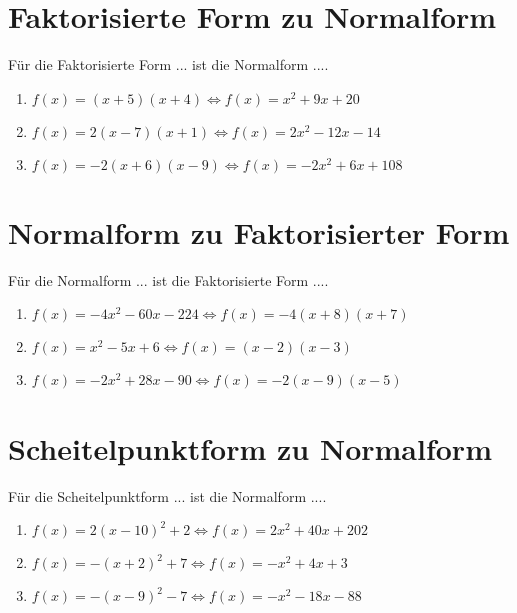 \documentclass{article}%
\begin{document}
\section{Faktorisierte Form zu Normalform}%
\label{sec:FaktorisierteFormzuNormalform}%
Für die Faktorisierte Form ... ist die Normalform ....%
\begin{enumerate}[label=\alph*)]%
\item%
\newline\vspace{0.5cm}$f(x)=(x+5)(x+4)\Leftrightarrow f(x)=x^2 + 9x + 20$%
\item%
\newline\vspace{0.5cm}$f(x)=2(x-7)(x+1)\Leftrightarrow f(x)=2x^2 - 12x - 14$%
\item%
\newline\vspace{0.5cm}$f(x)=-2(x+6)(x-9)\Leftrightarrow f(x)=-2x^2 + 6x + 108$%
\end{enumerate}

%
\section{Normalform zu Faktorisierter Form}%
\label{sec:NormalformzuFaktorisierterForm}%
Für die Normalform ... ist die Faktorisierte Form ....%
\begin{enumerate}[label=\alph*)]%
\item%
\newline\vspace{0.5cm}$f(x)=-4x^2 - 60x - 224\Leftrightarrow f(x)=-4(x+8)(x+7)$%
\item%
\newline\vspace{0.5cm}$f(x)=x^2 - 5x + 6\Leftrightarrow f(x)=(x-2)(x-3)$%
\item%
\newline\vspace{0.5cm}$f(x)=-2x^2 + 28x - 90\Leftrightarrow f(x)=-2(x-9)(x-5)$%
\end{enumerate}

%
\section{Scheitelpunktform zu Normalform}%
\label{sec:ScheitelpunktformzuNormalform}%
Für die Scheitelpunktform ... ist die Normalform ....%
\begin{enumerate}[label=\alph*)]%
\item%
\newline\vspace{0.5cm}$f(x)=2(x-10)^2 +2\Leftrightarrow f(x)=2x^2 + 40x + 202$%
\item%
\newline\vspace{0.5cm}$f(x)=-(x+2)^2 +7\Leftrightarrow f(x)=-x^2 + 4x + 3$%
\item%
\newline\vspace{0.5cm}$f(x)=-(x-9)^2 -7\Leftrightarrow f(x)=-x^2 - 18x - 88$%
\end{enumerate}
\end{document}
